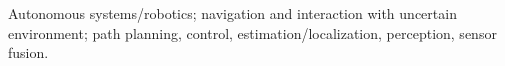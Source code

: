 Autonomous systems/robotics; navigation and interaction with uncertain environment; path planning, control, estimation/localization, perception, sensor fusion.
